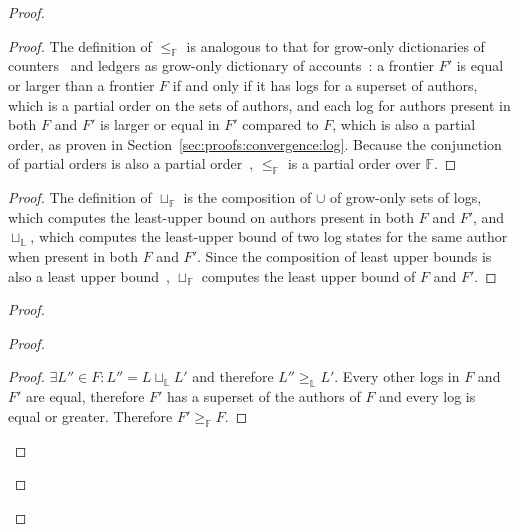 \documentclass[9pt, oneside]{article}   	%
\begin{document}
\begin{proof}
		
	\begin{proof}
		The definition of $\leq_\mathds{F}$ is analogous to that for grow-only dictionaries of counters~\cite{lavoie2023inftypset} and ledgers as grow-only dictionary of accounts~\cite{lavoie2023gocledger}: a frontier $F'$ is equal or larger than a frontier $F$ if and only if it has logs for a superset of authors, which is a partial order on the sets of authors, and each log for authors present in both $F$ and $F'$ is larger or equal in $F'$ compared to $F$, which is also a partial order, as proven in Section~\ref{sec:proofs:convergence:log}. Because the conjunction of partial orders is also a partial order~\cite{lavoie2023inftypset}, $\leq_\mathds{F}$ is a partial order over $\mathds{F}$.
	\end{proof}

	\begin{proof}
		The definition of $\sqcup_\mathds{F}$ is the composition of $\cup$ of grow-only sets of logs, which computes the least-upper bound on authors present in both $F$ and $F'$, and $\sqcup_\mathds{L}$, which computes the least-upper bound of two log states for the same author when present in both $F$ and $F'$. Since the composition of least upper bounds is also a least upper bound~\cite{lavoie2023gocledger}, $\sqcup_\mathds{F}$ computes the least upper bound of $F$ and $F'$.
	\end{proof}

	\begin{proof}
		\begin{proof}
			\begin{proof}
				$\exists L'' \in F : L'' = L \sqcup_\mathds{L} L'$ and therefore $L'' \geq_\mathds{L} L'$. Every other logs in $F$ and $F'$ are equal, therefore $F'$ has a superset of the authors of $F$ and every log is equal or greater. Therefore $F' \geq_\mathds{F} F$.
			\end{proof}
			

\end{proof}
\end{proof}
\end{proof}
\end{document}

